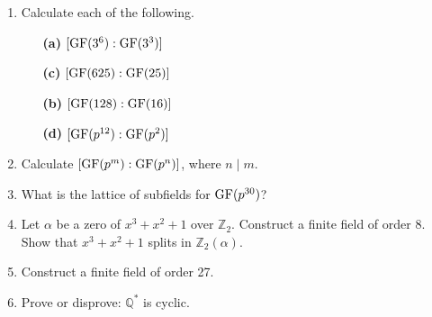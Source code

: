  
{\small
\begin{enumerate}

\bf\item\rm
Calculate each of the following.

\vspace{3pt}        %

\hspace{-7pt}
\begin{minipage}[t]{4.6in}
\noindent
\begin{minipage}[t]{2.25in}
\begin{itemize}
 
 \item[{\bf (a)}]
$[{\rm GF}(3^6) : {\rm GF}(3^3)]$
 
 \item[{\bf (c)}]
$[{\rm GF}(625) : {\rm GF}(25) ]$

\end{itemize}
\end{minipage} \hfill
\begin{minipage}[t]{2.25in}
\begin{itemize}
 
 \item[{\bf (b)}]
$[{\rm GF}(128): {\rm GF}(16)]$

 \item[{\bf (d)}]
$[{\rm GF}(p^{12}): {\rm GF}(p^2)]$
 
\end{itemize}
\end{minipage}
\end{minipage}

\vspace{2pt}        %


\bf\item\rm
Calculate $[{\rm GF}(p^m): {\rm GF}(p^n)]$, where $n \mid m$.


\bf\item\rm
What is the lattice of subfields for ${\rm GF}(p^{30})$?


\bf\item\rm
Let $\alpha$ be a zero of $x^3 + x^2 + 1$ over ${\mathbb Z}_2$. 
Construct a finite field of order 8. Show that
$x^3 + x^2 + 1$ splits in ${\mathbb Z}_2(\alpha)$. 
 

\bf\item\rm
Construct a finite field of order 27.


\bf\item\rm
Prove or disprove: ${\mathbb Q}^\ast$ is cyclic.


\end{enumerate}}

